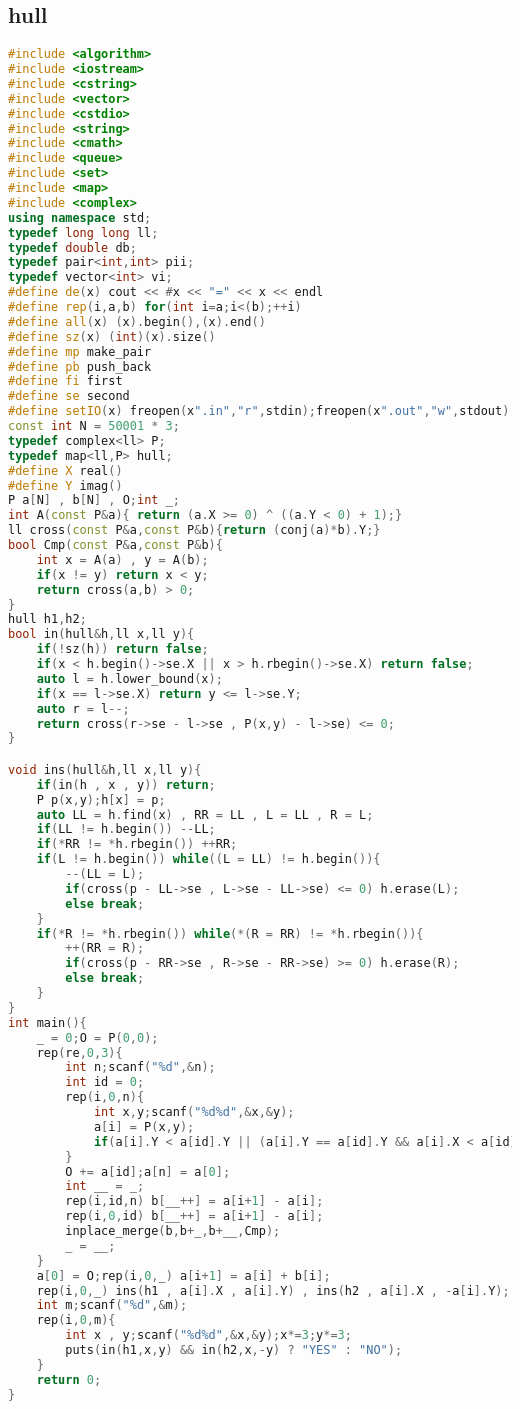 \subsection{hull}
\begin{lstlisting}[language=C++]
#include <algorithm>
#include <iostream>
#include <cstring>
#include <vector>
#include <cstdio>
#include <string>
#include <cmath>
#include <queue>
#include <set>
#include <map>
#include <complex>
using namespace std;
typedef long long ll;
typedef double db;
typedef pair<int,int> pii;
typedef vector<int> vi;
#define de(x) cout << #x << "=" << x << endl
#define rep(i,a,b) for(int i=a;i<(b);++i)
#define all(x) (x).begin(),(x).end()
#define sz(x) (int)(x).size()
#define mp make_pair
#define pb push_back
#define fi first
#define se second
#define setIO(x) freopen(x".in","r",stdin);freopen(x".out","w",stdout)
const int N = 50001 * 3;
typedef complex<ll> P;
typedef map<ll,P> hull;
#define X real()
#define Y imag()
P a[N] , b[N] , O;int _;
int A(const P&a){ return (a.X >= 0) ^ ((a.Y < 0) + 1);}
ll cross(const P&a,const P&b){return (conj(a)*b).Y;}
bool Cmp(const P&a,const P&b){
    int x = A(a) , y = A(b);
    if(x != y) return x < y;
    return cross(a,b) > 0;
}
hull h1,h2;
bool in(hull&h,ll x,ll y){
    if(!sz(h)) return false;
    if(x < h.begin()->se.X || x > h.rbegin()->se.X) return false;
    auto l = h.lower_bound(x);
    if(x == l->se.X) return y <= l->se.Y;
    auto r = l--;
    return cross(r->se - l->se , P(x,y) - l->se) <= 0;
}

void ins(hull&h,ll x,ll y){
    if(in(h , x , y)) return;
    P p(x,y);h[x] = p;
    auto LL = h.find(x) , RR = LL , L = LL , R = L;
    if(LL != h.begin()) --LL;
    if(*RR != *h.rbegin()) ++RR;
    if(L != h.begin()) while((L = LL) != h.begin()){
        --(LL = L);
        if(cross(p - LL->se , L->se - LL->se) <= 0) h.erase(L);
        else break;
    }
    if(*R != *h.rbegin()) while(*(R = RR) != *h.rbegin()){
        ++(RR = R);
        if(cross(p - RR->se , R->se - RR->se) >= 0) h.erase(R);
        else break;
    }
}
int main(){
    _ = 0;O = P(0,0);
    rep(re,0,3){
        int n;scanf("%d",&n);
        int id = 0;
        rep(i,0,n){
            int x,y;scanf("%d%d",&x,&y);
            a[i] = P(x,y);
            if(a[i].Y < a[id].Y || (a[i].Y == a[id].Y && a[i].X < a[id].X)) id = i;
        }
        O += a[id];a[n] = a[0];
        int __ = _;
        rep(i,id,n) b[__++] = a[i+1] - a[i];
        rep(i,0,id) b[__++] = a[i+1] - a[i];
        inplace_merge(b,b+_,b+__,Cmp);
        _ = __;
    }
    a[0] = O;rep(i,0,_) a[i+1] = a[i] + b[i];
    rep(i,0,_) ins(h1 , a[i].X , a[i].Y) , ins(h2 , a[i].X , -a[i].Y);
    int m;scanf("%d",&m);
    rep(i,0,m){
        int x , y;scanf("%d%d",&x,&y);x*=3;y*=3;
        puts(in(h1,x,y) && in(h2,x,-y) ? "YES" : "NO");
    }
    return 0;
}
\end{lstlisting}
